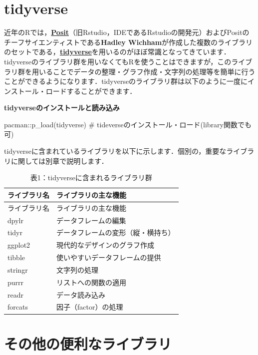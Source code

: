\documentclass[
  letterpaper,
  DIV=11,
  numbers=noendperiod]{scrreprt}
\newenvironment{Shaded}{\begin{snugshade}}{\end{snugshade}}
\newcommand{\CommentTok}[1]{\textcolor[rgb]{0.37,0.37,0.37}{#1}}
\newcommand{\FunctionTok}[1]{\textcolor[rgb]{0.28,0.35,0.67}{#1}}
\newcommand{\NormalTok}[1]{\textcolor[rgb]{0.00,0.23,0.31}{#1}}
\newcommand{\SpecialCharTok}[1]{\textcolor[rgb]{0.37,0.37,0.37}{#1}}
\begin{document}
\hypertarget{tidyverse}{%
\section{tidyverse}\label{tidyverse}}

近年のRでは，\href{https://posit.co/}{\textbf{Posit}}（旧Rstudio，IDEであるRstudioの開発元）およびPositのチーフサイエンティストである\textbf{Hadley
Wichham}が作成した複数のライブラリのセットである，\href{https://www.tidyverse.org/}{\textbf{tidyverse}}を用いるのがほぼ常識となってきています．tidyverseのライブラリ群を用いなくてもRを使うことはできますが，このライブラリ群を用いることでデータの整理・グラフ作成・文字列の処理等を簡単に行うことができるようになります．tidyverseのライブラリ群は以下のように一度にインストール・ロードすることができます．

\textbf{tidyverseのインストールと読み込み}

\begin{Shaded}
\begin{Highlighting}[]
\NormalTok{pacman}\SpecialCharTok{::}\FunctionTok{p\_load}\NormalTok{(tidyverse) }\CommentTok{\# tideverseのインストール・ロード(library関数でも可)}
\end{Highlighting}
\end{Shaded}

tidyverseに含まれているライブラリを以下に示します．個別の，重要なライブラリに関しては別章で説明します．

\begin{longtable}[]{@{}ll@{}}
\caption{表1：tidyverseに含まれるライブラリ群}\tabularnewline
\toprule()
ライブラリ名 & ライブラリの主な機能 \\
\midrule()
\endfirsthead
\toprule()
ライブラリ名 & ライブラリの主な機能 \\
\midrule()
\endhead
dpylr & データフレームの編集 \\
tidyr & データフレームの変形（縦・横持ち） \\
ggplot2 & 現代的なデザインのグラフ作成 \\
tibble & 使いやすいデータフレームの提供 \\
stringr & 文字列の処理 \\
purrr & リストへの関数の適用 \\
readr & データ読み込み \\
forcats & 因子（factor）の処理 \\
\bottomrule()
\end{longtable}

\hypertarget{ux305dux306eux4ed6ux306eux4fbfux5229ux306aux30e9ux30a4ux30d6ux30e9ux30ea}{%
\section{その他の便利なライブラリ}\label{ux305dux306eux4ed6ux306eux4fbfux5229ux306aux30e9ux30a4ux30d6ux30e9ux30ea}}
\end{document}
